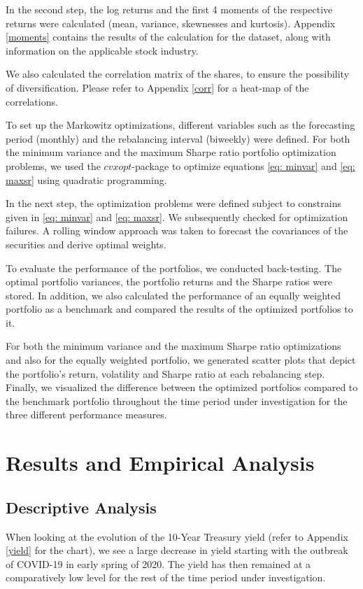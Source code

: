 \documentclass[a4paper,12pt]{article}
\begin{document}
In the second step, the log returns and the first 4 moments of the respective returns were calculated (mean, variance, skewnesses and kurtosis). Appendix \ref{moments} contains the results of the calculation for the dataset, along with information on the applicable stock industry. 

We also calculated the correlation matrix of the shares, to ensure the possibility of diversification. Please refer to Appendix \ref{corr}  for a heat-map of the correlations.

To set up the Markowitz optimizations, different variables such as the forecasting period (monthly) and the rebalancing interval (biweekly) were defined. For both the minimum variance and the maximum Sharpe ratio portfolio optimization problems, we used the $cvxopt$-package to optimize equations \ref{eq: minvar}  and \ref{eq: maxsr} using quadratic programming. 

In the next step, the optimization problems were defined subject to constrains given in \ref{eq: minvar} and \ref{eq: maxsr}. We subsequently checked for optimization failures. A rolling window approach was taken to forecast the covariances of the securities and derive optimal weights. 

To evaluate the performance of the portfolios, we  conducted back-testing. The optimal portfolio variances, the portfolio returns and the Sharpe ratios were stored. In addition, we also calculated the performance of an equally weighted portfolio as a benchmark and compared the results of the optimized portfolios to it.

For both the minimum variance and the maximum Sharpe ratio optimizations and also for the equally weighted portfolio, we generated scatter plots that depict the portfolio's return, volatility and Sharpe ratio at each rebalancing step. Finally, we visualized the difference between the optimized portfolios compared to the benchmark portfolio throughout the time period under investigation for the three different performance measures.

\newpage

\section{Results and Empirical Analysis}

\subsection{Descriptive Analysis}
When looking at the evolution of the 10-Year Treasury yield (refer to Appendix \ref{yield} for the chart), we see a large decrease in yield starting with the outbreak of COVID-19 in early spring of 2020. The yield has then remained at a comparatively low level for the rest of the time period under investigation. 
\end{document}
